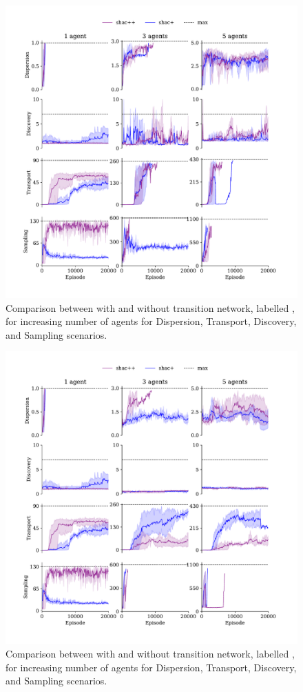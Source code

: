\begin{figure}[!t]
    \centering
    \includegraphics[width=\textwidth]{figs/ablation-transformer.pdf}
    \caption{Comparison between \fname{} with and without transition network, labelled \fnamer{}, for increasing number of agents for Dispersion, Transport, Discovery, and Sampling scenarios.}
    \label{fig:ablation}
\end{figure}

\begin{figure}[!t]
    \centering
    \includegraphics[width=\columnwidth]{figs/ablation-mlp.pdf}
    \caption{Comparison between \fname{} with and without transition network, labelled \fnamer{}, for increasing number of agents for Dispersion, Transport, Discovery, and Sampling scenarios.}
    \label{fig:ablation}
\end{figure}



